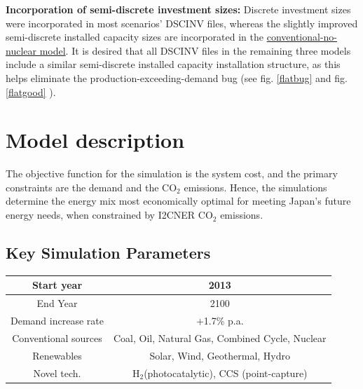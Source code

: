 \documentclass[14pt,a4paper]{article} %
\begin{document}
\textbf{Incorporation of semi-discrete investment sizes:} Discrete investment sizes were incorporated in most scenarios' \gls{DSCINV} files\cite{gargiulo_documentation_2005}, whereas the slightly improved semi-discrete installed  capacity sizes are incorporated in the \href{https://github.com/arfc/i2cner/tree/master/JPN-Main-Model/active/co2-constrnt-conv-nonuc}{conventional-no-nuclear model}. It is desired that all \gls{DSCINV} files in the remaining three models include a similar semi-discrete installed  capacity installation structure, as this helps eliminate the production-exceeding-demand bug (see fig. \ref{flatbug} and fig. \ref{flatgood} ).\\



\section{Model description}

The objective function \cite{loulou_documentation_2005} for the simulation is the system cost, and the primary constraints are the demand and the CO$_2$ emissions. Hence, the simulations determine the energy mix most economically optimal for meeting Japan's future energy needs, when constrained by \gls{I2CNER} CO$_2$ emissions.

\subsection{Key Simulation Parameters}

\begin{tabular}{|c|c|}
\hline
Start year & 2013 \\
\hline
End Year & 2100 \\
\hline
Demand increase rate & +1.7\% p.a. \cite{noauthor_electricity_2017} \\
\hline
Conventional sources & Coal, Oil, Natural Gas, Combined Cycle, Nuclear \\
\hline
Renewables & Solar, Wind, Geothermal, Hydro \\
\hline
Novel tech. & H$_2$(photocatalytic), \gls{CCS} (point-capture)\\
\hline
\end{tabular}

\vspace{7mm}
\end{document}
